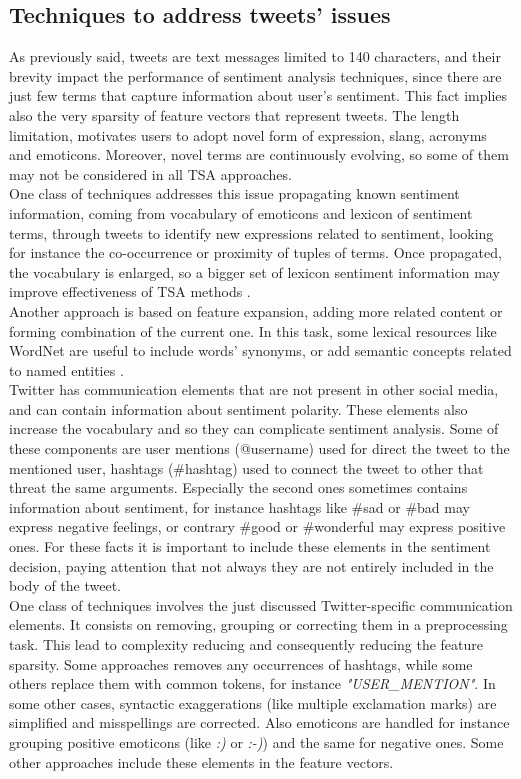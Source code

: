 \subsection{Techniques to address tweets' issues}
As previously said, tweets are text messages limited to 140 characters, and their brevity impact the performance of sentiment analysis techniques, since there are just few terms that capture information about user's sentiment. This fact implies also the very sparsity of feature vectors that represent tweets. The length limitation, motivates users to adopt novel form of expression, slang, acronyms and emoticons. Moreover, novel terms are continuously evolving, so some of them may not be considered in all \ac{TSA} approaches.\\
One class of techniques addresses this issue propagating known sentiment information, coming from vocabulary of emoticons and lexicon of sentiment terms, through tweets to identify new expressions related to sentiment, looking for instance the co-occurrence or proximity of tuples of terms. Once propagated, the vocabulary is enlarged, so a bigger set of lexicon sentiment information may improve effectiveness of \ac{TSA} methods \cite{tang-etal-2014-learning}.\\
Another approach is based on feature expansion, adding more related content or forming combination of the current one. In this task, some lexical resources like WordNet are useful to include words' synonyms, or add semantic concepts related to named entities \cite{montejo-raetz-etal-2014}.\\
Twitter has communication elements that are not present in other social media, and can contain information about sentiment polarity. These elements also increase the vocabulary and so they can complicate sentiment analysis. Some of these components are user mentions (@username) used for direct the tweet to the mentioned user, hashtags (\#hashtag) used to connect the tweet to other that threat the same arguments. Especially the second ones sometimes contains information about sentiment, for instance hashtags like \#sad or \#bad may express negative feelings, or contrary \#good or \#wonderful may express positive ones. For these facts it is important to include these elements in the sentiment decision, paying attention that not always they are not entirely included in the body of the tweet.\\
One class of techniques involves the just discussed Twitter-specific communication elements. It consists on removing, grouping or correcting them in a preprocessing task. This lead to complexity reducing and consequently reducing the feature sparsity. Some approaches removes any occurrences of hashtags, while some others replace them with common tokens, for instance \textit{"USER\_MENTION"}. In some other cases, syntactic exaggerations (like multiple exclamation marks) are simplified and misspellings are corrected. Also emoticons are handled for instance grouping positive emoticons (like \textit{:)} or \textit{:-)}) and the same for negative ones. Some other approaches include these elements in the feature vectors.\\

